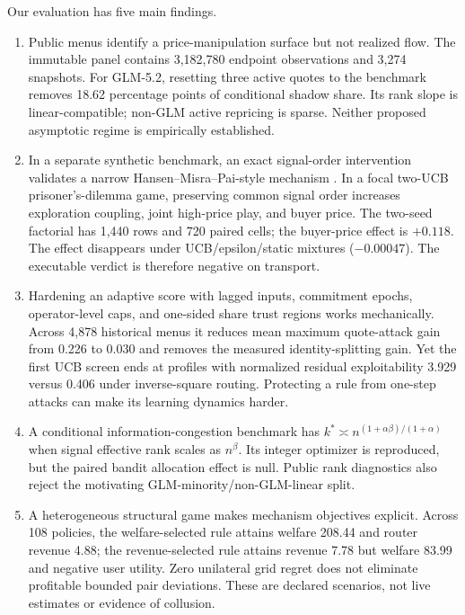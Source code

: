 \documentclass[10pt]{article}
\newcommand{\1}{\mathbf 1}
\begin{document}
Our evaluation has five main findings.

\begin{enumerate}
\item Public menus identify a price-manipulation surface but not realized flow.
The immutable panel contains 3,182,780 endpoint observations and 3,274
snapshots.  For GLM-5.2, resetting three active quotes to the benchmark removes
18.62 percentage points of conditional shadow share.  Its rank slope is
linear-compatible; non-GLM active repricing is sparse.  Neither proposed
asymptotic regime is empirically established.
\item In a separate synthetic benchmark, an exact signal-order intervention validates a narrow
Hansen--Misra--Pai-style mechanism \citep{hansenmisrapai2021}.  In a focal
two-UCB prisoner's-dilemma game, preserving common signal order increases
exploration coupling, joint high-price play, and buyer price.  The two-seed
factorial has 1,440 rows and 720 paired cells; the buyer-price effect is $+0.118$.
The effect disappears under UCB/epsilon/static mixtures ($-0.00047$).  The
executable verdict is therefore negative on transport.
\item Hardening an adaptive score with lagged inputs, commitment epochs,
operator-level caps, and one-sided share trust regions works mechanically.
Across 4,878 historical menus it reduces mean maximum quote-attack gain from
0.226 to 0.030 and removes the measured identity-splitting gain.  Yet the first
UCB screen ends at profiles with normalized residual exploitability 3.929 versus
0.406 under inverse-square routing.  Protecting a rule from one-step attacks can
make its learning dynamics harder.
\item A conditional information-congestion benchmark has
$k^*\asymp n^{(1+\alpha\beta)/(1+\alpha)}$ when signal effective rank scales as
$n^\beta$.  Its integer optimizer is reproduced, but the paired bandit
allocation effect is null.  Public rank diagnostics also reject the motivating
GLM-minority/non-GLM-linear split.
\item A heterogeneous structural game makes mechanism objectives explicit.
Across 108 policies, the welfare-selected rule attains welfare 208.44 and router
revenue 4.88; the revenue-selected rule attains revenue 7.78 but welfare 83.99
and negative user utility.  Zero unilateral grid regret does not eliminate
profitable bounded pair deviations.  These are declared scenarios, not live
estimates or evidence of collusion.
\end{enumerate}
\end{document}
